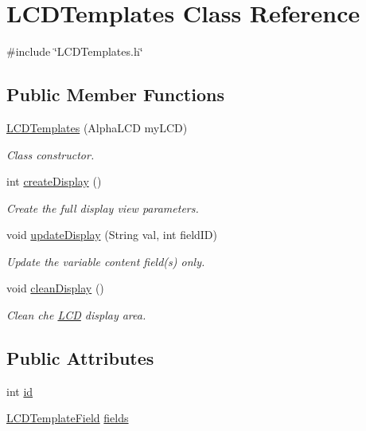 \hypertarget{class_l_c_d_templates}{\section{L\-C\-D\-Templates Class Reference}
\label{class_l_c_d_templates}
}


{\ttfamily \#include \char`\"{}L\-C\-D\-Templates.\-h\char`\"{}}

\subsection*{Public Member Functions}
\begin{DoxyCompactItemize}
\item 
\hyperlink{class_l_c_d_templates_a4b482ddedce1bcecefa097597b7bb2a4}{L\-C\-D\-Templates} (Alpha\-L\-C\-D my\-L\-C\-D)
\begin{DoxyCompactList}\small\item\em Class constructor. \end{DoxyCompactList}\item 
int \hyperlink{class_l_c_d_templates_a26e2851456f4a2e41b1a57221a29e652}{create\-Display} ()
\begin{DoxyCompactList}\small\item\em Create the full display view parameters. \end{DoxyCompactList}\item 
void \hyperlink{class_l_c_d_templates_a1b01b6974ed1f9433f5926aab699fc84}{update\-Display} (String val, int field\-I\-D)
\begin{DoxyCompactList}\small\item\em Update the variable content field(s) only. \end{DoxyCompactList}\item 
void \hyperlink{class_l_c_d_templates_a9aafd50a26d7bd5178ff7f99ae8a894d}{clean\-Display} ()
\begin{DoxyCompactList}\small\item\em Clean che \hyperlink{class_l_c_d}{L\-C\-D} display area. \end{DoxyCompactList}\end{DoxyCompactItemize}
\subsection*{Public Attributes}
\begin{DoxyCompactItemize}
\item 
int \hyperlink{class_l_c_d_templates_ad5102b181b458439b6714c9b2576f3b2}{id}
\item 
\hyperlink{struct_l_c_d_template_field}{L\-C\-D\-Template\-Field} \hyperlink{class_l_c_d_templates_a804bf1c0e5530bc8f685c52aace5519e}{fields}
\end{DoxyCompactItemize}
